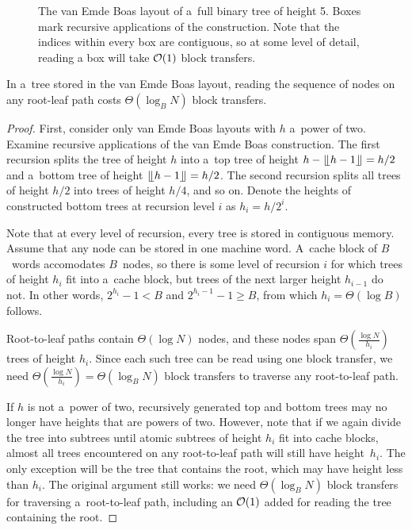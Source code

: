 \begin{figure}

\caption{The van Emde Boas layout of a~full binary tree of height 5.
Boxes mark recursive applications of the construction. Note that the indices
within every box are contiguous, so at some level of detail, reading
a box will take $\mathcal{O}(1)$ block transfers.}
\label{fig:veb_layout_5}
\end{figure}

\begin{theorem}
In a~tree stored in the van Emde Boas layout, reading the sequence of nodes
on any root-leaf path costs $\Theta(\log_B N)$ block transfers.
\end{theorem}

\begin{proof}
First, consider only van Emde Boas layouts with $h$ a~power of two.
Examine recursive applications of the van Emde Boas construction.
The first recursion splits the tree of height $h$ into a~top tree of height
$h-\lfloor \kern -0.22em \lfloor h-1\rfloor \kern -0.22em \rfloor=h/2$ and a~bottom tree of height $\lfloor \kern -0.22em \lfloor
h-1\rfloor \kern -0.22em \rfloor=h/2$. The second recursion splits all trees of height $h/2$
into trees of height $h/4$, and so on. Denote the heights of constructed bottom
trees at recursion level $i$ as $h_i=h/2^i$.

Note that at every level of recursion, every tree is stored in contiguous
memory. Assume that any node can be stored in one machine word. A~cache block
of $B$~words accomodates $B$~nodes, so there is some level of recursion $i$
for which trees of height $h_i$ fit into a~cache block, but trees of the next
larger height $h_{i-1}$ do not. In other words, $2^{h_i}-1 < B$ and
$2^{h_i-1}-1\geq B$, from which $h_i=\Theta(\log B)$ follows.

Root-to-leaf paths contain $\Theta(\log N)$ nodes, and these nodes span
$\Theta(\frac{\log N}{h_i})$ trees of height $h_i$. Since each such tree can be
read using one block transfer, we need $\Theta(\frac{\log N}{h_i})=\Theta(\log_B
N)$ block transfers to traverse any root-to-leaf path.

If $h$ is not a~power of two, recursively generated top and bottom trees may no
longer have heights that are powers of two. However, note that if we again
divide the tree into subtrees until atomic subtrees of height $h_i$ fit into
cache blocks, almost all trees encountered on any root-to-leaf path will still
have height~$h_i$. The only exception will be the tree that contains the root,
which may have height less than $h_i$. The original argument still works:
we need $\Theta(\log_B N)$ block transfers for traversing a~root-to-leaf path,
including an $\mathcal{O}(1)$ added for reading the tree containing the root.
\end{proof}

